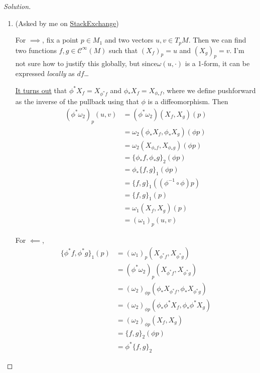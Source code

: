\begin{proof}[Solution]\leavevmode
	\begin{enumerate}[label=\alph*.]
		\item (Asked by me on \href{https://math.stackexchange.com/questions/4968780/diffeomorphism-is-poisson-map-iff-is-symplectomorphism}{StackExchange})

			For $\implies$, fix a point $p\in M_1$ and two vectors $u,v\in T_pM$. Then we can find two functions $f,g\in\mathcal{C}^\infty(M)$ such that $(X_f)_p=u$ and $(X_g)_p=v$. I'm not sure how to justify this globally, but since$\omega(u,\cdot )$ is a 1-form, it can be expressed \textit{locally} as $df$…

			\href{https://math.stackexchange.com/questions/3797762/symplectomorphisms-preserves-hamiltonian-equations}{It turns out} that $\phi^*X_f=X_{\phi^*f}$ and $\phi_*X_f=X_{\phi_*f}$, where we define pushforward as the inverse of the pullback using that $\phi$ is a diffeomorphism. Then
			 \begin{align*}
				 (\phi^*\omega_2)_p(u,v)&=(\phi^* \omega_2)(X_f,X_g)(p)\\
				 & = \omega_2(\phi _*X_f,\phi _*X_g)(\phi p)\\
				 &= \omega_2(X_{\phi_*f},X_{\phi_*g})(\phi p)\\
				 &=\{\phi_*f,\phi_*g\}_2(\phi p)\\
				 &=\phi_*\{f,g\}_1(\phi p)\\
				 &=\{f,g\}_1((\phi^{-1}\circ \phi)p)\\
				 &=\{f,g\}_1(p)\\
				 &=\omega_1(X_f,X_g)(p)\\
				 &=(\omega_1)_p(u,v)
			\end{align*}

			For $\impliedby$,
			\begin{align*}
\{\phi^* f,\phi^* g\}_1(p) & =(\omega_1)_p(X_{\phi^* f},X_{\phi^* g})\\
&=(\phi^* \omega_2)_p(X_{\phi^* f},X_{\phi^* g})\\
&=(\omega_2)_{\phi p}(\phi_* X_{\phi^* f},\phi_* X_{\phi^* g})\\
&=(\omega_2)_{\phi p}(\phi_* \phi^* X_{f},\phi_* \phi^* X_{g})\\
&=(\omega_2)_{\phi p}(X_f,X_g)\\
&=\{f,g\}_2(\phi p)\\
&=\phi^*\{f,g\}_2
\end{align*}


\end{enumerate}
\end{proof}
